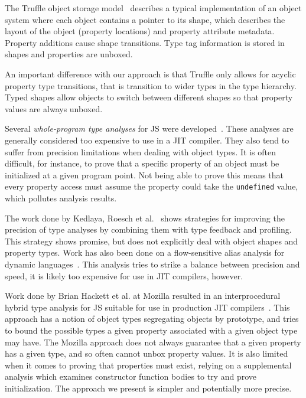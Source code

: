 \documentclass[preprint]{sigplanconf}
\begin{document}
The Truffle object storage model~\cite{truffle_obj} describes a typical
implementation of an object system where each object contains a pointer to
its shape, which describes the layout of the object (property locations) and
property attribute metadata. Property additions cause shape transitions.
Type tag information is stored in shapes and properties are unboxed.

An important difference with our approach is that Truffle only allows for
acyclic property type transitions, that is transition to wider types in the
type hierarchy. Typed shapes allow objects to switch between different shapes
so that property values are always unboxed.



Several {\em whole-program type analyses} for JS
were developed~\cite{tajs, tajs_lazy, type_ref}. These analyses are generally
considered too expensive to use in a JIT compiler. They also tend to suffer
from precision limitations when dealing with object types. It is often
difficult, for instance, to prove that a specific property of an object must be
initialized at a given program point. Not being able to prove this means that
every property access must assume the property could take the {\tt undefined}
value, which pollutes analysis results.

The work done by Kedlaya, Roesch et al.~\cite{impr_type_spec} shows strategies
for improving the precision of type analyses by combining them with type
feedback and profiling. This strategy shows promise, but does not explicitly
deal with object shapes and property types. Work has also been done on a
flow-sensitive alias analysis for dynamic languages~\cite{alias_dynamic}. This
analysis tries to strike a balance between precision and speed, it is likely
too expensive for use in JIT compilers, however.

Work done by Brian Hackett et al. at Mozilla resulted in an interprocedural
hybrid type analysis for JS suitable for use in production JIT
compilers~\cite{mozti}. This approach has a notion of object types segregating
objects by prototype, and tries to bound the possible types a given property
associated with a given object type may have. The Mozilla approach does not
always guarantee that a given property has a given type, and so often cannot
unbox property values. It is also limited when it comes to proving that
properties must exist, relying on a supplemental analysis which examines
constructor function bodies to try and prove initialization. The approach
we present is simpler and potentially more precise.
\end{document}
